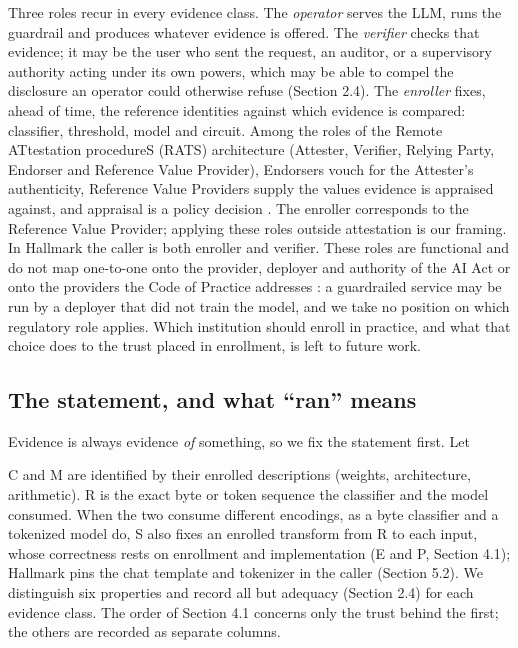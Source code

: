 \documentclass[11pt]{article}
\begin{document}
Three roles recur in every evidence class. The \emph{operator} serves the LLM, runs the guardrail and produces whatever evidence is offered. The \emph{verifier} checks that evidence; it may be the user who sent the request, an auditor, or a supervisory authority acting under its own powers, which may be able to compel the disclosure an operator could otherwise refuse (Section 2.4). The \emph{enroller} fixes, ahead of time, the reference identities against which evidence is compared: classifier, threshold, model and circuit. Among the roles of the Remote ATtestation procedureS (RATS) architecture (Attester, Verifier, Relying Party, Endorser and Reference Value Provider), Endorsers vouch for the Attester's authenticity, Reference Value Providers supply the values evidence is appraised against, and appraisal is a policy decision \cite{B5}. The enroller corresponds to the Reference Value Provider; applying these roles outside attestation is our framing. In Hallmark the caller is both enroller and verifier. These roles are functional and do not map one-to-one onto the provider, deployer and authority of the AI Act \cite{C26} or onto the providers the Code of Practice addresses \cite{D24}: a guardrailed service may be run by a deployer that did not train the model, and we take no position on which regulatory role applies. Which institution should enroll in practice, and what that choice does to the trust placed in enrollment, is left to future work.

\subsection{The statement, and what ``ran'' means}

Evidence is always evidence \emph{of} something, so we fix the statement first. Let

\begin{center}\end{center}

C and M are identified by their enrolled descriptions (weights, architecture, arithmetic). R is the exact byte or token sequence the classifier and the model consumed. When the two consume different encodings, as a byte classifier and a tokenized model do, S also fixes an enrolled transform from R to each input, whose correctness rests on enrollment and implementation (E and P, Section 4.1); Hallmark pins the chat template and tokenizer in the caller (Section 5.2). We distinguish six properties and record all but adequacy (Section 2.4) for each evidence class. The order of Section 4.1 concerns only the trust behind the first; the others are recorded as separate columns.
\end{document}
